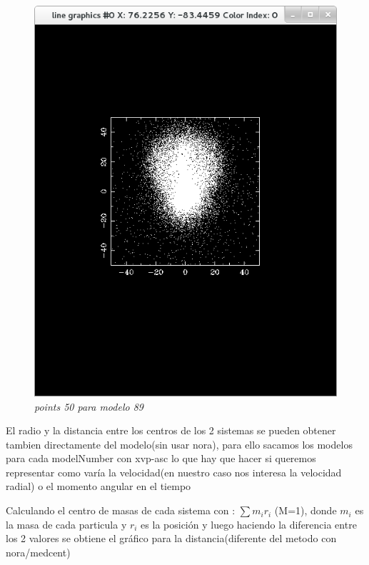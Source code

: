 \documentclass[12pt]{book}
\begin{document}
\begin{itemize}
\begin{figure}[!h]
 \centering
 \includegraphics[scale=0.5]{imgConModel89Points50.png}
 \caption{\emph{points 50 para modelo 89}}
 \label{Fig: 5}
\end{figure}

El radio y la distancia entre los centros de los 2 sistemas se pueden obtener tambien directamente del modelo(sin usar nora), para ello sacamos los modelos para cada modelNumber con xvp-asc lo que hay que hacer si queremos representar como varía la velocidad(en nuestro caso nos interesa la velocidad radial) o el momento angular en el tiempo

Calculando el centro de masas de cada sistema con :
$\sum{m_ir_i}$ (M=1), donde $m_i$ es la masa de cada particula y $r_i$ es la posición 
y luego haciendo la diferencia entre los 2 valores se obtiene el gráfico para la distancia(diferente del metodo con nora/medcent)


\end{itemize}
\end{document}
